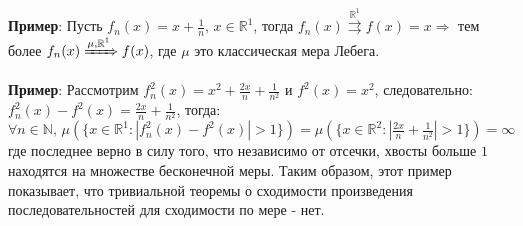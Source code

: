 \documentclass[12pt]{article}
\newcommand{\MR}{\mathbb{R}}
\newcommand{\MN}{\mathbb{N}}
\theoremstyle{definition}
\newcommand{\uconv}[1]{\overset{#1}{\rightrightarrows}}
\begin{document}
\textbf{Пример}: Пусть $f_n(x) = x + \tfrac{1}{n}, \, x \in \MR^1$, тогда $f_n(x) \uconv{\MR^1} f(x) = x \Rightarrow$ тем более $f_n(x) \xRightarrow{\mu,\MR^1} f(x)$, где $\mu$ это классическая мера Лебега.

\textbf{Пример}: Рассмотрим $f_n^2(x) = x^2 + \tfrac{2x}{n} + \tfrac{1}{n^2}$ и $f^2(x) = x^2$, следовательно: $f_n^2(x) - f^2(x) = \tfrac{2x}{n} + \tfrac{1}{n^2}$, тогда:
$$
	\forall n \in \MN, \, \mu\left(\{x\in \MR^1 \colon |f_n^2(x) - f^2(x)| > 1\}\right) = \mu\left(\{x \in \MR^2 \colon |\tfrac{2x}{n} + \tfrac{1}{n^2}| > 1\}\right) = \infty
$$
где последнее верно в силу того, что независимо от отсечки, хвосты больше $1$ находятся на множестве бесконечной меры. Таким образом, этот пример показывает, что тривиальной теоремы о сходимости произведения последовательностей для сходимости по мере - нет.
\end{document}
